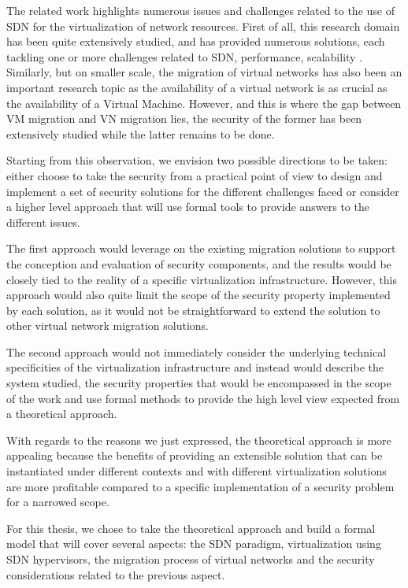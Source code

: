 The related work highlights numerous issues and challenges related to the use of SDN for the virtualization of network resources.
First of all, this research domain has been quite extensively studied, and has provided numerous solutions, each tackling one or more challenges related to SDN, performance, scalability \etc.
Similarly, but on smaller scale, the migration of virtual networks has also been an important research topic as the availability of a virtual network is as crucial as the availability of a Virtual Machine.
However, and this is where the gap between VM migration and VN migration lies, the security of the former has been extensively studied while the latter remains to be done.

Starting from this observation, we envision two possible directions to be taken: either choose to take the security from a practical point of view to  design and implement a set of security solutions for the different challenges faced or consider a higher level approach that will use formal tools to provide answers to the different issues. 

The first approach would leverage on the existing migration solutions to support the conception and evaluation of security components, and the results would be closely tied to the reality of a specific virtualization infrastructure. However, this approach would also quite limit the scope of the security property implemented by each solution, as it would not be straightforward to extend the solution to other virtual network migration solutions.


The second approach would not immediately consider the underlying technical specificities of the virtualization infrastructure and instead would describe the system studied, the security properties that would be encompassed in the scope of the work and use formal methods to provide the high level view expected from a theoretical approach.

With regards to the reasons we just expressed, the theoretical approach is more appealing because the benefits of providing an extensible solution that can be instantiated under different contexts and with different virtualization solutions are more profitable compared to a specific implementation of a security problem for a narrowed scope.

For this thesis, we chose to take the theoretical approach and build a formal model that will cover several aspects: the SDN paradigm, virtualization using SDN hypervisors, the migration process of virtual networks and the security considerations related to the previous aspect.

